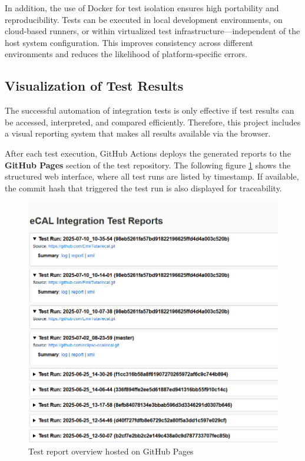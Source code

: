 \vspace{1em}
In addition, the use of Docker for test isolation ensures high portability and reproducibility. Tests can be executed in local development environments, on cloud-based runners, or within virtualized test infrastructure—independent of the host system configuration. This improves consistency across different environments and reduces the likelihood of platform-specific errors.

\clearpage
\subsection{Visualization of Test Results}

The successful automation of integration tests is only effective if test results can be accessed, interpreted, and compared efficiently. Therefore, this project includes a visual reporting system that makes all results available via the browser.

\vspace{0.9em}
After each test execution, GitHub Actions deploys the generated reports to the \textbf{GitHub Pages} section of the test repository. The following figure \ref{fig:gh_pages_overview} shows the structured web interface, where all test runs are listed by timestamp. If available, the commit hash that triggered the test run is also displayed for traceability.

\begin{figure}[H]
	\centering
	\includegraphics[width=\textwidth]{Images/github_pages_overview.png}
	\caption{Test report overview hosted on GitHub Pages}
	\label{fig:gh_pages_overview}
\end{figure}

